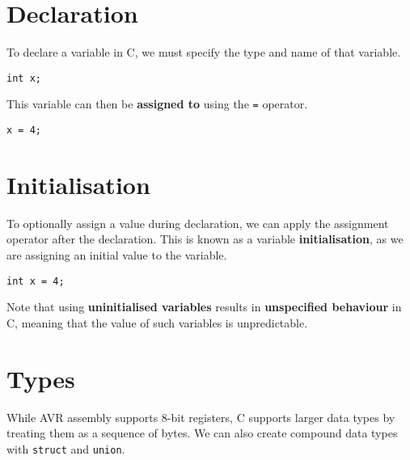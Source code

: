 \documentclass[a4paper]{report}
\begin{document}
\section{Declaration}
To declare a variable in C, we must specify the type and name of that
variable.
\begin{verbatim}
int x;
\end{verbatim}
This variable can then be \textbf{assigned to} using the
\texttt{=} operator.
\begin{verbatim}
x = 4;
\end{verbatim}
\section{Initialisation}
To optionally assign a value during declaration, we can apply the
assignment operator after the declaration. This is known as a variable
\textbf{initialisation}, as we are assigning an initial value to the
variable.
\begin{verbatim}
int x = 4;
\end{verbatim}
Note that using \textbf{uninitialised variables} results in
\textbf{unspecified behaviour} in C, meaning that the value of such
variables is unpredictable.
\section{Types}
While AVR assembly supports 8-bit registers, C supports larger data
types by treating them as a sequence of bytes. We can also create
compound data types with \texttt{struct} and
\texttt{union}.
\end{document}
